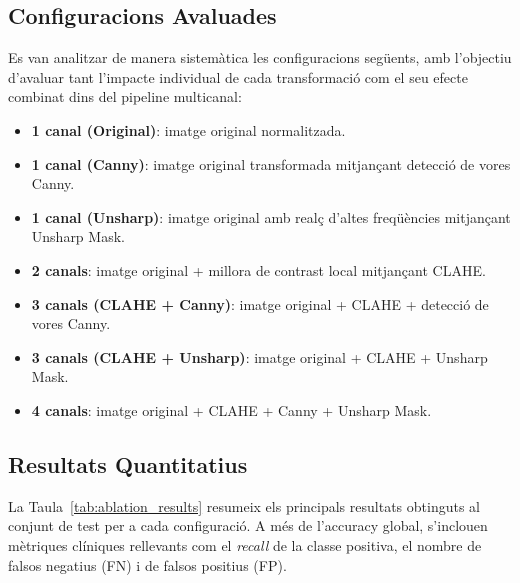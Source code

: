 \documentclass[12pt,a4paper]{article}
\begin{document}
\subsection{Configuracions Avaluades}

Es van analitzar de manera sistemàtica les configuracions següents, amb l’objectiu
d’avaluar tant l’impacte individual de cada transformació com el seu efecte combinat
dins del pipeline multicanal:

\begin{itemize}
    \item \textbf{1 canal (Original)}: imatge original normalitzada.
    \item \textbf{1 canal (Canny)}: imatge original transformada mitjançant detecció de vores Canny.
    \item \textbf{1 canal (Unsharp)}: imatge original amb realç d’altes freqüències mitjançant Unsharp Mask.
    \item \textbf{2 canals}: imatge original + millora de contrast local mitjançant CLAHE.
    \item \textbf{3 canals (CLAHE + Canny)}: imatge original + CLAHE + detecció de vores Canny.
    \item \textbf{3 canals (CLAHE + Unsharp)}: imatge original + CLAHE + Unsharp Mask.
    \item \textbf{4 canals}: imatge original + CLAHE + Canny + Unsharp Mask.
\end{itemize}


\subsection{Resultats Quantitatius}

La Taula~\ref{tab:ablation_results} resumeix els principals resultats obtinguts al conjunt
de test per a cada configuració. A més de l’accuracy global, s’inclouen mètriques
clíniques rellevants com el \textit{recall} de la classe positiva, el nombre de falsos
negatius (FN) i de falsos positius (FP).
\end{document}
